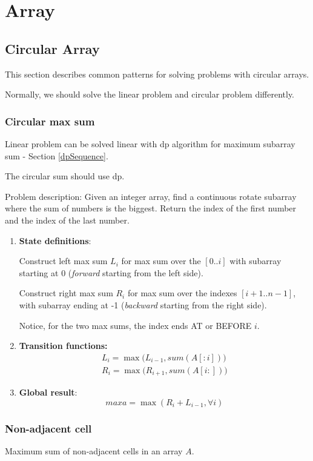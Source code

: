 \chapter{Array}
\section{Circular Array}
This section describes common patterns for solving problems with circular arrays.

Normally, we should solve the linear problem and circular problem differently.

\subsection{Circular max sum}
Linear problem can be solved linear with dp algorithm for maximum subarray sum - Section \ref{dpSequence}. 

The circular sum should use dp. 

Problem description: Given an integer array, find a continuous rotate subarray where the sum of numbers is the biggest. Return the index of the first number and the index of the last number. 
\begin{enumerate}
\item \textbf{State definitions}: 

Construct left max sum $L_i$ for max sum over the $[0..i]$ with subarray starting at 0 (\textit{forward} starting from the left side). 

Construct right max sum $R_i$ for max sum over the indexes $[i+1..n -1]$, with subarray ending at -1 (\textit{backward} starting from the right side). 

Notice, for the two max sums, the index ends AT or BEFORE $i$.

\item \textbf{Transition functions:}
\begin{align*}
L_i = \max\Big(L_{i-1}, sum(A[:i])\Big) \\ 
R_i = \max\Big(R_{i+1}, sum(A[i:])\Big)
\end{align*}

\item \textbf{Global result}: 
$$maxa = \max(R_i+L_{i-1}, \forall i)$$
\end{enumerate}

\subsection{Non-adjacent cell}
Maximum sum of non-adjacent cells in an array $A$.

